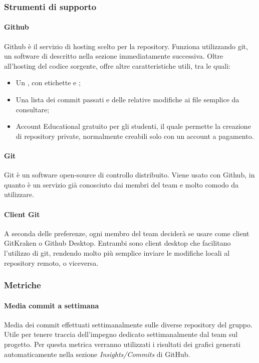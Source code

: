 \subsubsection{Strumenti di supporto}
\paragraph{Github}\Spazio
Github è il servizio di hosting scelto per la repository. Funziona utilizzando git, un software di  descritto nella sezione immediatamente successiva. Oltre all'hosting del codice sorgente, offre altre caratteristiche utili, tra le quali:
\begin{itemize}
	\item Un , con etichette e ;
	\item Una lista dei commit passati e delle relative modifiche ai file semplice da consultare;
	\item Account Educational gratuito per gli studenti, il quale permette la creazione di repository private, normalmente creabili solo con un account a pagamento.
\end{itemize}

\paragraph{Git}\Spazio
Git è un software open-source di controllo  distribuito.
Viene usato con Github, in quanto è un servizio già conosciuto dai membri del team e molto comodo da utilizzare.

\paragraph{Client Git}\Spazio
A seconda delle preferenze, ogni membro del team deciderà se usare come client GitKraken o Github Desktop. Entrambi sono client desktop che facilitano l'utilizzo di git, rendendo molto più semplice inviare le modifiche locali al repository remoto, o viceversa.

\subsubsection{Metriche}
\paragraph{Media commit a settimana} \Spazio
Media dei commit effettuati settimanalmente sulle diverse repository del gruppo. Utile per tenere traccia dell'impegno dedicato settimanalmente dal team sul progetto. Per questa metrica verranno utilizzati i risultati dei grafici generati automaticamente nella sezione \emph{Insights/Commits} di GitHub.

